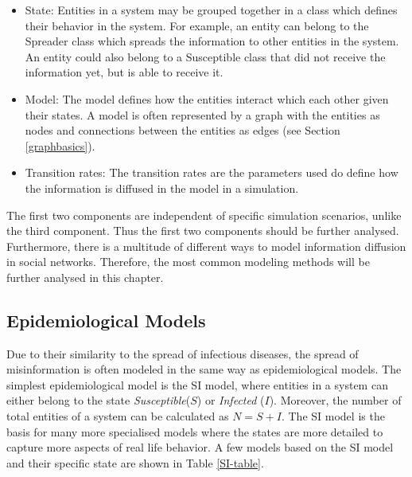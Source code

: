 \begin{itemize}
    \item State: Entities in a system may be grouped together in a class which
    defines their behavior in the system. For example, 
    an entity can belong to the  \glqq Spreader \grqq{} class which 
    spreads the information
    to other entities in the system. An entity could also belong to a
    \glqq Susceptible \grqq{} class that did not receive the information yet, 
    but is able to receive it.
    \item Model: The model defines how the entities interact which each other
    given their states. A model is often represented by a graph with the entities
    as nodes and connections between the entities as edges 
    (see Section \ref{graphbasics}).
    \item Transition rates: The transition rates are the parameters used
    do define how the information is diffused in the model in a simulation. 
\end{itemize}

The first two components are independent of specific simulation scenarios,
unlike the third component. Thus the first two components should be further
analysed. Furthermore, there is a multitude of different ways 
to model information diffusion in social networks. Therefore, the most common
modeling methods will be further analysed in this chapter.

\subsection{Epidemiological Models}
\label{epidemologicalmodels}

Due to their similarity to the spread of infectious diseases, 
the spread of misinformation is often modeled in the same way as epidemiological models.
The simplest epidemiological model is the SI model, where entities in a system
can either belong to the state \textit{Susceptible}($S$) or 
\textit{Infected} ($I$). Moreover, the number of total entities of a 
system can be calculated as $N=S+I$. The SI model is the basis for many
more specialised models where the states are more detailed to capture more 
aspects of real life behavior. A few models based on the SI model and their 
specific state are shown in Table \ref{SI-table}.

